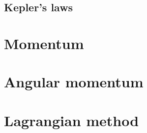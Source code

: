     \subsection{Kepler's laws}
\section{Momentum}
\section{Angular momentum}
\section{Lagrangian method}